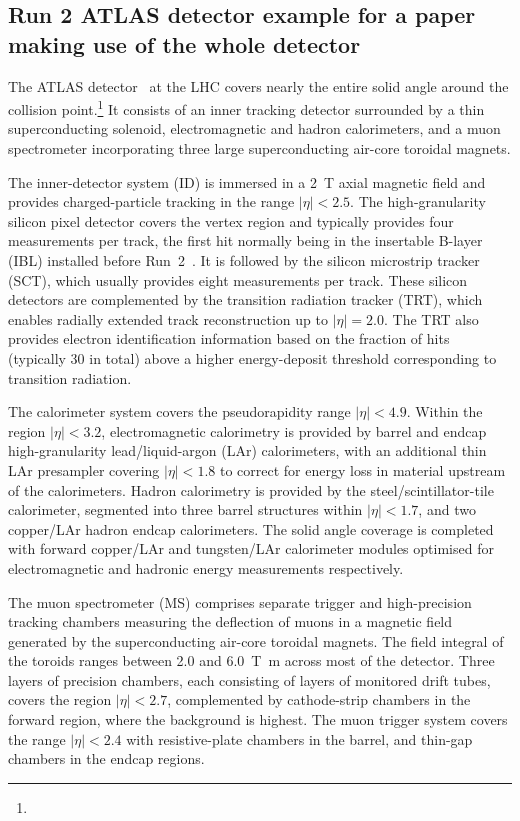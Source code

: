 \subsection{Run 2 ATLAS detector example for a paper making use of the whole detector}
\label{sec:atlas2b}

The ATLAS detector~\cite{PERF-2007-01} at the LHC covers nearly the entire solid angle around the collision point.\footnote{\AtlasCoordFootnote}
It consists of an inner tracking detector surrounded by a thin superconducting solenoid, electromagnetic and hadron calorimeters,
and a muon spectrometer incorporating three large superconducting air-core toroidal magnets.

The inner-detector system (ID) is immersed in a \qty{2}{\tesla} axial magnetic field 
and provides charged-particle tracking in the range \(|\eta| < 2.5\).
The high-granularity silicon pixel detector covers the vertex region and typically provides four measurements per track, 
the first hit normally being in the insertable B-layer (IBL) installed before Run~2~\cite{ATLAS-TDR-19,PIX-2018-001}.
It is followed by the silicon microstrip tracker (SCT), which usually provides eight measurements per track.
These silicon detectors are complemented by the transition radiation tracker (TRT),
which enables radially extended track reconstruction up to \(|\eta| = 2.0\). 
The TRT also provides electron identification information 
based on the fraction of hits (typically 30 in total) above a higher energy-deposit threshold corresponding to transition radiation.

The calorimeter system covers the pseudorapidity range \(|\eta| < 4.9\).
Within the region \(|\eta|< 3.2\), electromagnetic calorimetry is provided by barrel and 
endcap high-granularity lead/liquid-argon (LAr) calorimeters,
with an additional thin LAr presampler covering \(|\eta| < 1.8\)
to correct for energy loss in material upstream of the calorimeters.
Hadron calorimetry is provided by the steel/scintillator-tile calorimeter,
segmented into three barrel structures within \(|\eta| < 1.7\), and two copper/LAr hadron endcap calorimeters.
The solid angle coverage is completed with forward copper/LAr and tungsten/LAr calorimeter modules
optimised for electromagnetic and hadronic energy measurements respectively.

The muon spectrometer (MS) comprises separate trigger and
high-precision tracking chambers measuring the deflection of muons in a magnetic field generated by the superconducting air-core toroidal magnets.
The field integral of the toroids ranges between \num{2.0} and \qty{6.0}{\tesla\metre}
across most of the detector. 
Three layers of precision chambers, each consisting of layers of monitored drift tubes, covers the region \(|\eta| < 2.7\),
complemented by cathode-strip chambers in the forward region, where the background is highest.
The muon trigger system covers the range \(|\eta| < 2.4\) with resistive-plate chambers in the barrel, and thin-gap chambers in the endcap regions.

